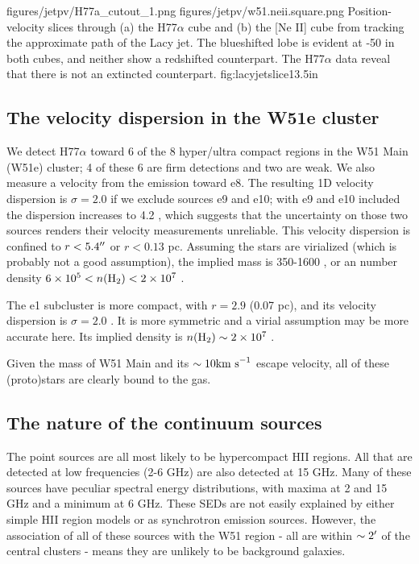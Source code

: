 \FigureTwo
{figures/jetpv/H77a_cutout_1.png}
{figures/jetpv/w51.neii.square.png}
{Position-velocity slices through (a) the H77$\alpha$ cube and (b) the [Ne II]
cube from \citet{Lacy2007a} tracking the approximate path of the Lacy jet.  The
blueshifted lobe is evident at -50 \kms in both cubes, and neither show a
redshifted counterpart.  The H77$\alpha$ data reveal that there is not an
extincted counterpart.}
{fig:lacyjetslice}{1}{3.5in}

\subsection{The velocity dispersion in the W51e cluster}
We detect H77$\alpha$ toward 6 of the 8 hyper/ultra compact \hii regions in the
W51 Main (W51e) cluster; 4 of these 6 are firm detections and two are weak.  We
also measure a velocity from the \formaldehyde emission toward e8.  The
resulting 1D velocity dispersion is $\sigma=2.0$ \kms if we exclude sources e9
and e10; with e9 and e10 included the dispersion increases to 4.2 \kms, which
suggests that the uncertainty on those two sources renders their velocity
measurements unreliable.  This velocity dispersion is confined to
$r<5.4\mbox{$^{\prime\prime}$}$ or $r<0.13$ pc.  Assuming the stars are virialized (which is
probably not a good assumption), the implied mass is 350-1600 \msun, or an \hh
number density $6\times10^{5} < n(\textrm{H}_{2}) < 2\times10^{7}$ \percc.

The e1 subcluster is more compact, with $r=2.9$ \arcsec (0.07 pc), and its
velocity dispersion is $\sigma=2.0$ \kms.  It is more symmetric and a virial
assumption may be more accurate here.  Its implied density
is $n(\textrm{H}_{2})\sim2\times10^{7}$ \percc.

Given the mass of W51 Main and its $\sim10\textrm{km~s}^{-1}$ escape velocity, all of these
(proto)stars are clearly bound to the gas. 

\subsection{The nature of the continuum sources}
The point sources are all most likely to be hypercompact HII regions.  All that
are detected at low frequencies (2-6 GHz) are also detected at 15 GHz.  Many of
these sources have peculiar spectral energy distributions, with maxima at 2 and
15 GHz and a minimum at 6 GHz.  These SEDs are not easily explained by either
simple HII region models or as synchrotron emission sources.  However, the
association of all of these sources with the W51 region - all are within
$\sim2\mbox{$^\prime$}$ of the central clusters - means they are unlikely to be
background galaxies.  

